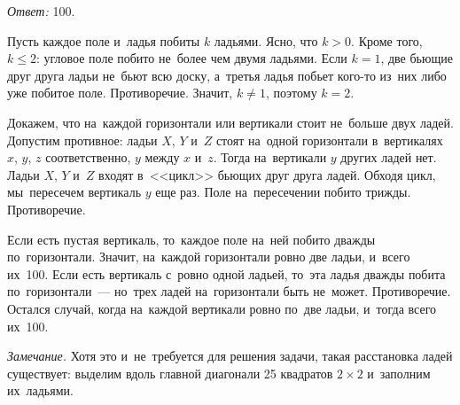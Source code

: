 \ifincludesolutions
\emph{Ответ:} 100.
\par
Пусть каждое поле и~ладья побиты $k$ ладьями.
Ясно, что $k > 0$.
Кроме того, $k \leq 2$: угловое поле побито не~более чем двумя ладьями.
Если $k = 1$, две бьющие друг друга ладьи не~бьют всю доску, а~третья ладья
побьет кого-то из~них либо уже побитое поле.
Противоречие.
Значит, $k \neq 1$, поэтому $k = 2$.
\par
Докажем, что на~каждой горизонтали или вертикали стоит не~больше двух ладей.
Допустим противное: ладьи $X$, $Y$ и~$Z$ стоят на~одной горизонтали
в~вертикалях $x$, $y$, $z$ соответственно, $y$ между $x$ и~$z$.
Тогда на~вертикали $y$ других ладей нет.
Ладьи $X$, $Y$ и~$Z$ входят в~<<цикл>> бьющих друг друга ладей.
Обходя цикл, мы~пересечем вертикаль $y$ еще раз.
Поле на~пересечении побито трижды.
Противоречие.
\par
Если есть пустая вертикаль, то~каждое поле на~ней побито дважды по~горизонтали.
Значит, на~каждой горизонтали ровно две ладьи, и~всего их~100.
Если есть вертикаль с~ровно одной ладьей, то~эта ладья дважды побита
по~горизонтали~--- но~трех ладей на~горизонтали быть не~может.
Противоречие.
Остался случай, когда на~каждой вертикали ровно по~две ладьи, и~тогда всего
их~100.
\par
\emph{Замечание.}
Хотя это и~не~требуется для решения задачи, такая расстановка ладей существует:
выделим вдоль главной диагонали 25 квадратов $2 \times 2$ и~заполним
их~ладьями.
\fi %

\endgroup %

